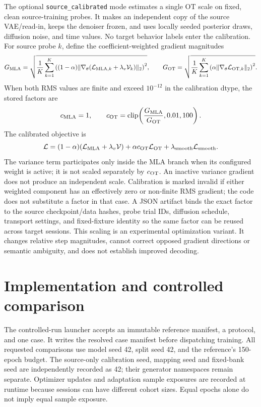 \documentclass[11pt,a4paper]{article}
\begin{document}
The optional \texttt{source\_calibrated} mode estimates a single OT scale on
fixed, clean source-training probes. It makes an independent copy of the
source VAE/read-in, keeps the denoiser frozen, and uses locally seeded
posterior draws, diffusion noise, and time values. No target behavior labels
enter the calibration. For source probe $k$, define the coefficient-weighted
gradient magnitudes
\begin{equation}
 G_{\rm MLA}=\sqrt{\frac{1}{K}\sum_{k=1}^{K}
       \left((1-\alpha)\|\nabla_\theta(\mathcal L_{{\rm MLA},k}
                                  +\lambda_v\mathcal V_k)\|_2\right)^2},
 \qquad
 G_{\rm OT}=\sqrt{\frac{1}{K}\sum_{k=1}^{K}
       \left(\alpha\|\nabla_\theta\mathcal L_{{\rm OT},k}\|_2\right)^2}.
\end{equation}
When both RMS values are finite and exceed $10^{-12}$ in the calibration
dtype, the stored factors are
\begin{equation}
 c_{\rm MLA}=1,\qquad
 c_{\rm OT}=\operatorname{clip}\!\left(\frac{G_{\rm MLA}}{G_{\rm OT}},
                                      0.01,100\right).
\end{equation}
The calibrated objective is
\begin{equation}
 \mathcal L=(1-\alpha)(\mathcal L_{\rm MLA}+\lambda_v\mathcal V)
       +\alpha c_{\rm OT}\mathcal L_{\rm OT}
       +\lambda_{\rm smooth}\mathcal L_{\rm smooth}.
\end{equation}
The variance term participates only inside the MLA branch when its configured
weight is active; it is not scaled separately by $c_{\rm OT}$. An inactive
variance gradient does not produce an independent scale. Calibration is
marked invalid if either weighted component has
an effectively zero or non-finite RMS gradient; the code does not substitute a
factor in that case. A JSON artifact binds the exact factor to the source
checkpoint/data hashes, probe trial IDs, diffusion schedule, transport
settings, and fixed-fixture identity so the same factor can be reused across
target sessions. This scaling is an experimental optimization variant. It
changes relative step magnitudes, cannot correct opposed gradient directions
or semantic ambiguity, and does not establish improved decoding.

\section{Implementation and controlled comparison}

The controlled-run launcher accepts an immutable reference manifest, a protocol,
and one case. It writes the resolved case manifest before dispatching training.
All requested comparisons use model seed 42, split seed 42, and the reference's
150-epoch budget. The source-only calibration seed, mapping seed and fixed-bank
seed are independently recorded as 42; their generator namespaces remain
separate. Optimizer updates and adaptation sample exposures are recorded at
runtime because sessions can have different cohort sizes. Equal epochs alone
do not imply equal sample exposure.
\end{document}
